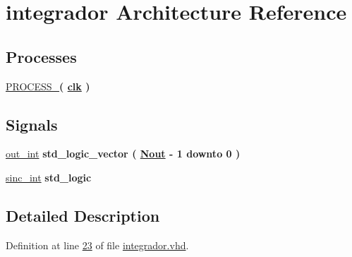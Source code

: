 \hypertarget{classintegrador_1_1integrador}{}\section{integrador Architecture Reference}
\label{classintegrador_1_1integrador}
\subsection*{Processes}
 \begin{DoxyCompactItemize}
\item 
\hyperlink{classintegrador_1_1integrador_afcc525892643d4614179ad348921cd15}{P\+R\+O\+C\+E\+S\+S\+\_}{\bfseries  ( {\bfseries {\bfseries \hyperlink{classintegrador_a4a4609c199d30b3adebbeb3a01276ec5}{clk}} \textcolor{vhdlchar}{ }} )}
\end{DoxyCompactItemize}
\subsection*{Signals}
 \begin{DoxyCompactItemize}
\item 
\hyperlink{classintegrador_1_1integrador_a951e616187c21eeebaa382a516df536e}{out\+\_\+int} {\bfseries \textcolor{comment}{std\+\_\+logic\+\_\+vector}\textcolor{vhdlchar}{ }\textcolor{vhdlchar}{(}\textcolor{vhdlchar}{ }\textcolor{vhdlchar}{ }\textcolor{vhdlchar}{ }\textcolor{vhdlchar}{ }{\bfseries \hyperlink{classintegrador_a061c0d632c8bdf5dd32c80acf9a9c475}{Nout}} \textcolor{vhdlchar}{-\/}\textcolor{vhdlchar}{ } \textcolor{vhdldigit}{1} \textcolor{vhdlchar}{ }\textcolor{keywordflow}{downto}\textcolor{vhdlchar}{ }\textcolor{vhdlchar}{ } \textcolor{vhdldigit}{0} \textcolor{vhdlchar}{ }\textcolor{vhdlchar}{)}\textcolor{vhdlchar}{ }} 
\item 
\hyperlink{classintegrador_1_1integrador_a45126d1a75be347f440d181b7aa5e033}{sinc\+\_\+int} {\bfseries \textcolor{comment}{std\+\_\+logic}\textcolor{vhdlchar}{ }} 
\end{DoxyCompactItemize}


\subsection{Detailed Description}


Definition at line \hyperlink{integrador_8vhd_source_l00023}{23} of file \hyperlink{integrador_8vhd_source}{integrador.\+vhd}.



